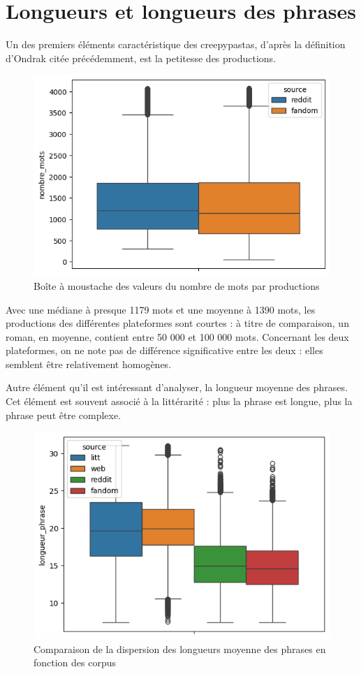 \documentclass[12pt,a4paper,oneside,titlepage]{book} %
\begin{document}
	\section{Longueurs et longueurs des phrases}
	Un des premiers éléments caractéristique des creepypastas, d'après la définition d'Ondrak citée précédemment, est la petitesse des productions. 
	
	\begin{figure}[htbp]
		\centering
		\includegraphics{illustration/boxplot_nombre_mots.png}
		\caption{Boîte à moustache des valeurs du nombre de mots par productions}
	\end{figure}
	
	Avec une médiane à presque 1179 mots et une moyenne à 1390 mots, les productions des différentes plateformes sont courtes : à titre de comparaison, un roman, en moyenne, contient entre 50 000 et 100 000 mots.
	Concernant les deux plateformes, on ne note pas de différence significative entre les deux : elles semblent être relativement homogènes. 
	
	Autre élément qu'il est intéressant d'analyser, la longueur moyenne des phrases. Cet élément est souvent associé à la littérarité : plus la phrase est longue, plus la phrase peut être complexe. 
	
		\begin{figure}[htbp]
		\centering
		\includegraphics{illustration/boxplot_phrases.png}
		\caption{Comparaison de la dispersion des longueurs moyenne des phrases en fonction des corpus}
	\end{figure}
	
\end{document}
